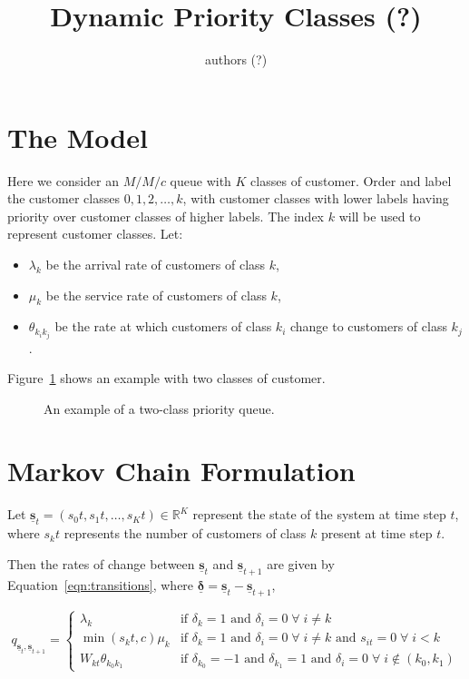 \documentclass{article}
\title{Dynamic Priority Classes (?)}
\author{authors (?)}
\date{}
\begin{document}
\maketitle

\section{The Model}
Here we consider an $M/M/c$ queue with $K$ classes of customer.
Order and label the customer classes $0, 1, 2, \dots, k$, with customer classes
with lower labels having priority over customer classes of higher labels.
The index $k$ will be used to represent customer classes.
Let:

\begin{itemize}
  \item $\lambda_k$ be the arrival rate of customers of class $k$,
  \item $\mu_k$ be the service rate of customers of class $k$,
  \item $\theta_{k_ik_j}$ be the rate at which customers of class $k_i$ change
  to customers of class $k_j$.
\end{itemize}

Figure~\ref{fig:twoclass_example} shows an example with two classes of customer.

\begin{figure}
\begin{center}

\end{center}
\caption{An example of a two-class priority queue.}
\label{fig:twoclass_example}
\end{figure}


\section{Markov Chain Formulation}
Let $\underline{\mathbf{s}}_t = (s_0t, s_1t, \dots, s_Kt) \in \mathbb{R}^K$
represent the state of the system at time step $t$, where $s_kt$ represents the
number of customers of class $k$ present at time step $t$.

Then the rates of change between $\underline{\mathbf{s}}_t$ and
$\underline{\mathbf{s}}_{t+1}$ are given by Equation~\ref{eqn:transitions},
where $\underline{\mathbf{\delta}} = \underline{\mathbf{s}}_t - \underline{\mathbf{s}}_{t+1}$,

\begin{equation}\label{eqn:transitions}
q_{\underline{\mathbf{s}}_t, \underline{\mathbf{s}}_{t+1}} = 
\begin{cases}
\lambda_k & \text{if } \delta_k = 1 \text{ and } \delta_i = 0 \; \forall \; i \neq k \\
\min(s_kt, c) \mu_k & \text{if } \delta_k = 1 \text{ and } \delta_i = 0 \; \forall \; i \neq k \text{ and } s_{it} = 0 \; \forall \; i < k \\
W_{kt} \theta_{k_0k_1} & \text{if } \delta_{k_0} = -1 \text{ and } \delta_{k_1} = 1 \text{ and } \delta_i = 0 \; \forall \; i \notin (k_0, k_1)
\end{cases}
\end{equation}
\end{document}
